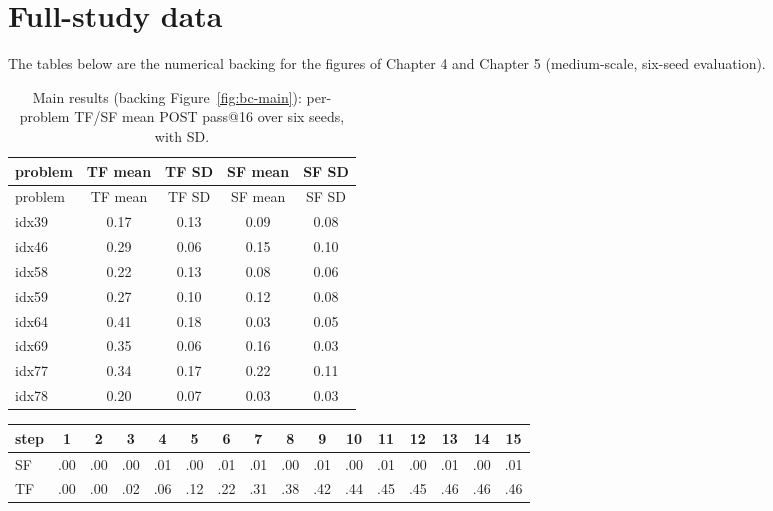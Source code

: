 \documentclass[12pt,a4paper]{report}
\begin{document}
\chapter{Full-study data}\label{appendix-g-full-study-data}

The tables below are the numerical backing for the figures of Chapter 4 and Chapter 5 (medium-scale, six-seed evaluation).



\begin{longtable}{lcccc}
\caption[Main results: per-problem TF/SF mean POST pass@16]{Main results (backing Figure~\ref{fig:bc-main}): per-problem TF/SF mean POST pass@16 over six seeds, with SD.}\\
\toprule
problem & TF mean & TF SD & SF mean & SF SD \\
\midrule
\endfirsthead
\toprule
problem & TF mean & TF SD & SF mean & SF SD \\
\midrule
\endhead
\bottomrule
\endfoot
idx39 & 0.17 & 0.13 & 0.09 & 0.08 \\
idx46 & 0.29 & 0.06 & 0.15 & 0.10 \\
idx58 & 0.22 & 0.13 & 0.08 & 0.06 \\
idx59 & 0.27 & 0.10 & 0.12 & 0.08 \\
idx64 & 0.41 & 0.18 & 0.03 & 0.05 \\
idx69 & 0.35 & 0.06 & 0.16 & 0.03 \\
idx77 & 0.34 & 0.17 & 0.22 & 0.11 \\
idx78 & 0.20 & 0.07 & 0.03 & 0.03 \\
\end{longtable}



\begin{center}\footnotesize\setlength{\tabcolsep}{3pt}
\begin{tabular}{lccccccccccccccc}
\toprule
step & 1 & 2 & 3 & 4 & 5 & 6 & 7 & 8 & 9 & 10 & 11 & 12 & 13 & 14 & 15 \\
\midrule
SF & .00 & .00 & .00 & .01 & .00 & .01 & .01 & .00 & .01 & .00 & .01 & .00 & .01 & .00 & .01 \\
TF & .00 & .00 & .02 & .06 & .12 & .22 & .31 & .38 & .42 & .44 & .45 & .45 & .46 & .46 & .46 \\
\bottomrule
\end{tabular}\par\end{center}
\end{document}
